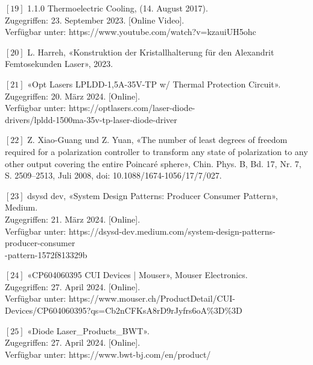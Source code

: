 $[19]$	1.1.0 Thermoelectric Cooling, (14. August 2017).\\
Zugegriffen: 23. September 2023. [Online Video].\\
Verfügbar unter: https://www.youtube.com/watch?v=kzauiUH5ohc

$[20]$	L. Harreh, «Konstruktion der Kristallhalterung für den Alexandrit Femtosekunden Laser», 2023.

$[21]$	«Opt Lasers LPLDD-1,5A-35V-TP w/ Thermal Protection Circuit».\\
Zugegriffen: 20. März 2024. [Online].\\
Verfügbar unter: https://optlasers.com/laser-diode-\\
drivers/lpldd-1500ma-35v-tp-laser-diode-driver

$[22]$ Z. Xiao-Guang und Z. Yuan, «The number of least degrees of freedom required for a polarization controller to transform any state of polarization to any other output covering the entire Poincaré sphere», Chin. Phys. B, Bd. 17, Nr. 7, S. 2509–2513, Juli 2008, doi: 10.1088/1674-1056/17/7/027.

$[23]$  dsysd dev, «System Design Patterns: Producer Consumer Pattern», Medium.\\
Zugegriffen: 21. März 2024. [Online].\\
Verfügbar unter: https://dsysd-dev.medium.com/system-design-patterns-producer-consumer\\
-pattern-1572f813329b

$[24]$  «CP604060395 CUI Devices | Mouser», Mouser Electronics.\\
Zugegriffen: 27. April 2024. [Online].\\
Verfügbar unter: https://www.mouser.ch/ProductDetail/CUI-Devices/CP604060395?qs=Cb2nCFKsA8rD9rJyfrs6oA\%3D\%3D

$[25]$  «Diode Laser\_Products\_BWT».\\
Zugegriffen: 27. April 2024. [Online].\\
Verfügbar unter: https://www.bwt-bj.com/en/product/